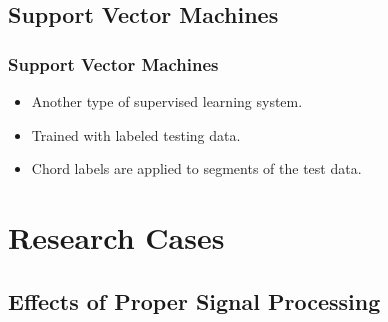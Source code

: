 \documentclass{beamer}
\begin{document}
\subsection{Support Vector Machines}

\begin{frame}
	\frametitle{Support Vector Machines}
	\begin{itemize}
		\item Another type of supervised learning system. 
		\item Trained with labeled testing data.
		\item Chord labels are applied to segments of the test data.
	\end{itemize}
\end{frame}

\section[Research Cases]{Research Cases}

\subsection[Effects of Proper Signal Processing]{Effects of Proper Signal Processing}
\end{document}

